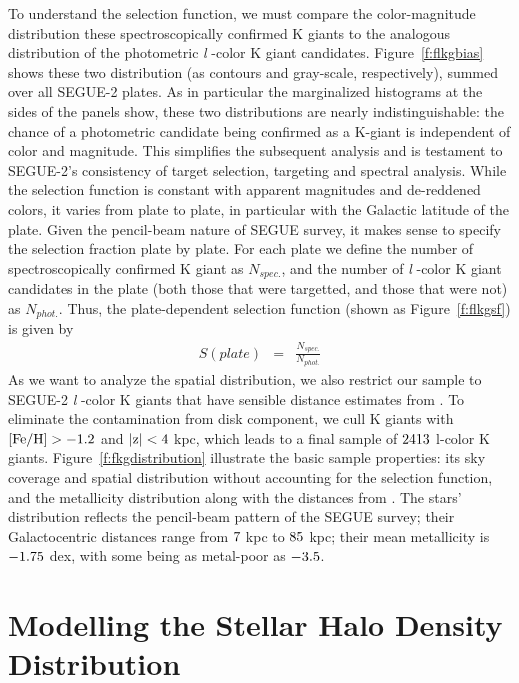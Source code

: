 \documentclass[12pt,preprint]{aastex}
\newcommand{\feh}{{\rm [Fe/H]}}
\begin{document}
To understand the selection function, we must compare the color-magnitude distribution these spectroscopically confirmed K giants
to the analogous distribution of the photometric \textit{l} -color K giant candidates.
Figure~\ref{f:flkgbias} shows these two distribution (as contours and gray-scale, respectively), summed over all SEGUE-2 plates. As in particular the marginalized histograms at the sides of the panels show, these two distributions are nearly indistinguishable: the chance of a photometric candidate being confirmed as a K-giant is independent of color and magnitude. This simplifies the subsequent analysis and is testament to SEGUE-2's consistency of target selection, targeting and spectral analysis.
While the selection function is constant with apparent magnitudes and de-reddened colors, it varies from plate to plate, in particular with the Galactic latitude of the plate. Given the pencil-beam nature of SEGUE survey, it makes sense to specify the selection fraction plate by plate.
For each plate we define the number of spectroscopically confirmed K giant as $N_{spec.}$, and the number of \textit{l} -color K giant candidates in the plate (both those that were targetted, and those that were not) as $N_{phot.}$. Thus, the plate-dependent selection function (shown as Figure~\ref{f:flkgsf}) is given by
\begin{eqnarray}
S(plate) &=& \frac{N_{spec.}}{N_{phot.}}
\end{eqnarray}
As we want to analyze the spatial distribution, we also restrict our sample to SEGUE-2
\textit{l} -color K giants that have sensible distance estimates from \citet{Xue2014}. To eliminate the contamination from disk
component, we cull K giants with $\rm \feh>-1.2$ and $\rm |z|<4~$kpc, which leads to a final sample of $\rm 2413$
l-color K giants. Figure~\ref{f:fkgdistribution} illustrate the basic sample properties: its sky coverage and spatial
distribution without accounting for the selection function, and the metallicity distribution along with the distances
from \citet{Xue2014}. The stars' distribution reflects the pencil-beam pattern of the SEGUE survey; their Galactocentric
distances range from $\rm 7~$kpc to $\rm 85~$kpc; their mean metallicity is $\rm -1.75~$dex, with some being
as metal-poor as $\rm -3.5$.

\section{Modelling the Stellar Halo Density Distribution}\label{sec:Modelling}
\end{document}
